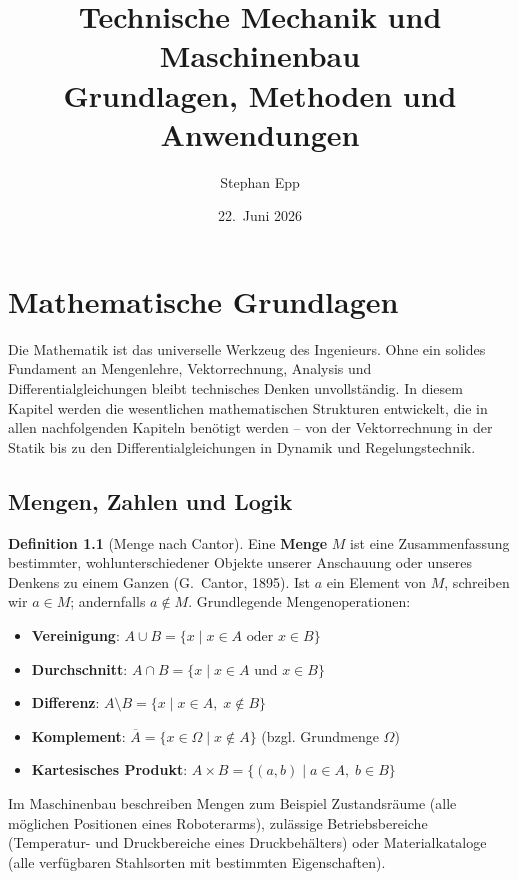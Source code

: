 ﻿\documentclass[a4paper,12pt]{report}
\title{\textbf{Technische Mechanik und Maschinenbau}\\
{\Large Grundlagen, Methoden und Anwendungen}}
\author{Stephan Epp}
\date{22.\ Juni 2026}
\theoremstyle{definition}
\newtheorem{definition}{Definition}
\begin{document}
\renewcommand{\proofname}{Beweis}
\maketitle
\tableofcontents
\newpage

\chapter{Mathematische Grundlagen}

Die Mathematik ist das universelle Werkzeug des Ingenieurs. Ohne ein
solides Fundament an Mengenlehre, Vektorrechnung, Analysis und Differentialgleichungen
bleibt technisches Denken unvollst\"andig. In diesem Kapitel werden
die wesentlichen mathematischen Strukturen entwickelt, die in allen
nachfolgenden Kapiteln ben\"otigt werden -- von der Vektorrechnung
in der Statik bis zu den Differentialgleichungen in Dynamik und Regelungstechnik.

\section{Mengen, Zahlen und Logik}

\begin{definition}[Menge nach Cantor]
Eine \textbf{Menge} $M$ ist eine Zusammenfassung bestimmter,
wohlunterschiedener Objekte unserer Anschauung oder unseres Denkens
zu einem Ganzen (G.~Cantor, 1895).
Ist $a$ ein Element von $M$, schreiben wir $a \in M$; andernfalls $a \notin M$.
Grundlegende Mengenoperationen:
\begin{itemize}
    \item[-] \textbf{Vereinigung}: $A \cup B = \{x \mid x \in A \text{ oder } x \in B\}$
    \item[-] \textbf{Durchschnitt}: $A \cap B = \{x \mid x \in A \text{ und } x \in B\}$
    \item[-] \textbf{Differenz}: $A \setminus B = \{x \mid x \in A,\; x \notin B\}$
    \item[-] \textbf{Komplement}: $\overline{A} = \{x \in \Omega \mid x \notin A\}$ (bzgl. Grundmenge $\Omega$)
    \item[-] \textbf{Kartesisches Produkt}: $A \times B = \{(a,b) \mid a \in A,\; b \in B\}$
\end{itemize}
\end{definition}

Im Maschinenbau beschreiben Mengen zum Beispiel Zustandsr\"aume
(alle m\"oglichen Positionen eines Roboterarms), zul\"assige Betriebsbereiche
(Temperatur- und Druckbereiche eines Druckbeh\"alters) oder Materialkataloge
(alle verf\"ugbaren Stahlsorten mit bestimmten Eigenschaften).
\end{document}
